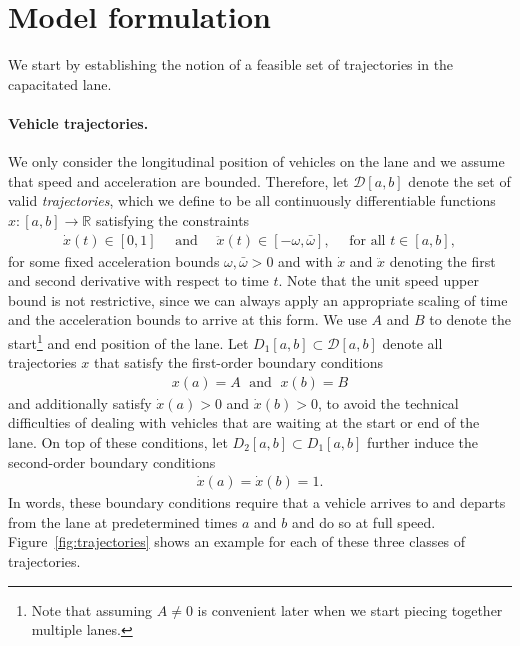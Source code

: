 \documentclass[a4paper]{report}
\theoremstyle{definition}
\theoremstyle{plain}
\begin{document}
\section{Model formulation}

We start by establishing the notion of a feasible set of trajectories
in the capacitated lane.

\paragraph{Vehicle trajectories.}
We only consider the longitudinal position of vehicles on the lane and we assume
that speed and acceleration are bounded. Therefore, let $\mathcal{D}[a,b]$
denote the set of valid \emph{trajectories}, which we define to be all continuously
differentiable functions $x : [a,b] \rightarrow \mathbb{R}$ satisfying the constraints
\begin{align}
  \dot{x}(t) \in [0, 1] \quad \text{ and } \quad
  \ddot{x}(t) \in [{-\omega} ,\bar{\omega}] , \quad \text{ for all } t \in [a,b] ,
\end{align}
for some fixed acceleration bounds $\omega, \bar{\omega} > 0$ and with $\dot{x}$ and
$\ddot{x}$ denoting the first and second derivative with respect to time $t$.
Note that the unit speed upper bound is not restrictive, since we can always
apply an appropriate scaling of time and the acceleration bounds to arrive at
this form.
%
We use $A$ and $B$ to denote the start\footnote{Note that assuming $A\neq 0$ is convenient later when we start piecing together multiple lanes.} and end position of the lane.
%
Let $D_{1}[a, b] \subset \mathcal{D}[a, b]$ denote all trajectories $x$ that satisfy
the first-order boundary conditions
\begin{align}
  x(a) = A \; \text{ and } \; x(b) = B
\end{align}
and additionally satisfy $\dot{x}(a) > 0$ and $\dot{x}(b) > 0$, to avoid the
technical difficulties of dealing with vehicles that are waiting at the start or
end of the lane.
%
On top of these conditions, let $D_{2}[a,b] \subset D_{1}[a, b]$ further induce the
second-order boundary conditions
\begin{align}
  \dot{x}(a) = \dot{x}(b) = 1 .
\end{align}
In words, these boundary conditions require that a vehicle arrives to and
departs from the lane at predetermined times $a$ and $b$ and do so at full
speed.
%
Figure~\ref{fig:trajectories} shows an example for each of these three classes of trajectories.
\end{document}

